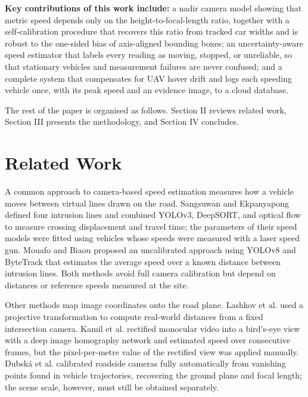 \documentclass[conference]{IEEEtran}
\begin{document}
\textbf{Key contributions of this work include:} a nadir camera model showing that metric speed depends only on the height-to-focal-length ratio, together with a self-calibration procedure that recovers this ratio from tracked car widths and is robust to the one-sided bias of axis-aligned bounding boxes; an uncertainty-aware speed estimator that labels every reading as moving, stopped, or unreliable, so that stationary vehicles and measurement failures are never confused; and a complete system that compensates for UAV hover drift and logs each speeding vehicle once, with its peak speed and an evidence image, to a cloud database.

The rest of the paper is organised as follows. Section II reviews related work, Section III presents the methodology, and Section IV concludes.

\section{Related Work}

A common approach to camera-based speed estimation measures how a vehicle moves between virtual lines drawn on the road. Sangsuwan and Ekpanyapong \cite{ref4} defined four intrusion lines and combined YOLOv3, DeepSORT, and optical flow to measure crossing displacement and travel time; the parameters of their speed models were fitted using vehicles whose speeds were measured with a laser speed gun. Mouafo and Biaou \cite{ref1} proposed an uncalibrated approach using YOLOv8 and ByteTrack that estimates the average speed over a known distance between intrusion lines. Both methods avoid full camera calibration but depend on distances or reference speeds measured at the site.

Other methods map image coordinates onto the road plane. Lashkov et al. \cite{ref5} used a projective transformation to compute real-world distances from a fixed intersection camera. Kamil et al. \cite{ref3} rectified monocular video into a bird's-eye view with a deep image homography network and estimated speed over consecutive frames, but the pixel-per-metre value of the rectified view was applied manually. Dubsk\'a et al. \cite{ref2} calibrated roadside cameras fully automatically from vanishing points found in vehicle trajectories, recovering the ground plane and focal length; the scene scale, however, must still be obtained separately.
\end{document}
